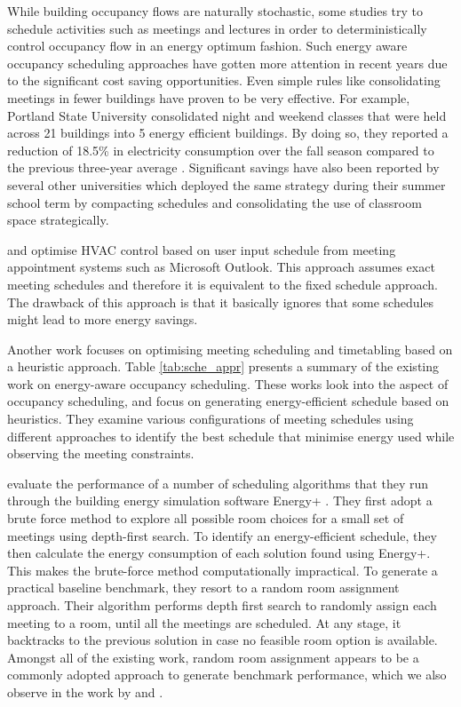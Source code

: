 While building occupancy flows are naturally stochastic, some studies try to schedule activities such as meetings and lectures in order to deterministically control occupancy flow in an energy optimum fashion. Such energy aware occupancy scheduling approaches have gotten more attention in recent years due to the significant cost saving opportunities. Even simple rules like consolidating meetings in fewer buildings have proven to be very effective. For example, Portland State University consolidated night and weekend classes that were held across 21 buildings into 5 energy efficient buildings. By doing so, they reported a reduction of 18.5\% in electricity consumption over the fall season compared to the previous three-year average \citep{portland:2012}. Significant savings have also been reported by several other universities \citep{msu:2009,ncu:2015,iowa:2015} which deployed the same strategy during their summer school term by compacting schedules and consolidating the use of classroom space strategically.

\cite{balaji2013zonepac} and \cite{capehart2007web} optimise HVAC control based on user input schedule from meeting appointment systems such as Microsoft Outlook. This approach assumes exact meeting schedules and therefore it is equivalent to the fixed schedule approach. The drawback of this approach is that it basically ignores that some schedules might lead to more energy savings.

Another work focuses on optimising meeting scheduling and timetabling based on a heuristic approach. Table \ref{tab:sche_appr} presents a summary of the existing work on energy-aware occupancy scheduling. These works look into the aspect of occupancy scheduling, and focus on generating energy-efficient schedule based on heuristics. They examine various configurations of meeting schedules using different approaches to identify the best schedule that minimise energy used while observing the meeting constraints.

\cite{majumdar2012energy} evaluate the performance of a number of scheduling algorithms that they run through the building energy simulation software Energy+ \citep{crawley2000energyplus}. They first adopt a brute force method to explore all possible room choices for a small set of meetings using depth-first search. To identify an energy-efficient schedule, they then calculate the energy consumption of each solution found using Energy+. This makes the brute-force method computationally impractical. To generate a practical baseline benchmark, they resort to a random room assignment approach. Their algorithm performs depth first search to randomly assign each meeting to a room, until all the meetings are scheduled. At any stage, it backtracks to the previous solution in case no feasible room option is available. Amongst all of the existing work, random room assignment appears to be a commonly adopted approach to generate benchmark performance, which we also observe in the work by \cite{klein2012coordinating} and \cite{chai2014minimizing}.

